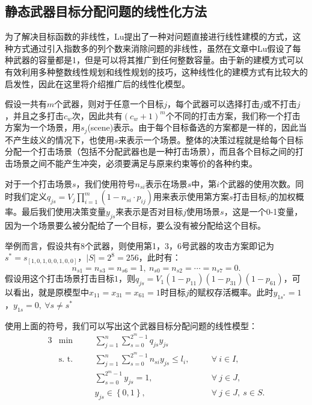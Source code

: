 \subsection{静态武器目标分配问题的线性化方法}
为了解决目标函数的非线性，Lu提出了一种对问题直接进行线性建模的方式，这种方式通过引入指数多的列个数来消除问题的非线性，虽然在文章中Lu假设了每种武器的容量都是1，但是可以将其推广到任何整数容量。由于新的建模方式可以有效利用多种整数线性规划和线性规划的技巧，这种线性化的建模方式有比较大的启发性，因此在这里将介绍推广后的线性化模型。

假设一共有$m$个武器，则对于任意一个目标$j$，每个武器可以选择打击$j$或不打击$j$，并且之多打击$c_w$次，因此共有$(c_w + 1)^m$个不同的打击方案，我们称一个打击方案为一个场景，用$s_j$(scene)表示。由于每个目标备选的方案都是一样的，因此当不产生歧义的情况下，也使用$s$来表示一个场景。整体的决策过程就是给每个目标分配一个打击场景（包括不分配武器也是一种打击场景），而且各个目标之间的打击场景之间不能产生冲突，必须要满足与原来约束等价的各种约束。

对于一个打击场景$s$，我们使用符号$n_{si}$表示在场景$s$中，第$i$个武器的使用次数。同时我们定义$q_{js} = V_j \prod_{i = 1}^m (1 - n_{si}\cdot p_{ij})$用来表示使用第方案$s$打击目标$j$的加权概率。最后我们使用决策变量$y_{js}$来表示是否对目标$j$使用场景$s$，这是一个0-1变量，因为一个场景要么被分配给了一个目标，要么没有被分配给这个目标。


举例而言，假设共有8个武器，则使用第1，3，6号武器的攻击方案即记为$s^* = s_{[1,0,1,0,0,1,0,0]}$，$|S| = 2^8 = 256$，此时有：
\begin{equation*} 
    n_{s1} = n_{s3} = n_{s6} = 1,\ n_{s0} = n_{s2} = \cdots = n_{s7} = 0.
\end{equation*}
假设用这个打击场景打击目标$1$，则$q_{js} = V_1(1 - p_{11})(1 - p_{31})(1 - p_{61})$，可以看出，就是原模型中$x_{11} = x_{31} = x_{61} = 1$时目标$j$的赋权存活概率。此时$y_{1s^*} = 1$，$y_{1s} = 0,\ \forall s \neq s^*$

使用上面的符号，我们可以写出这个武器目标分配问题的线性模型：
\begin{alignat}{3}
	&\min\quad && \sum_{j=1}^n \sum_{s=0}^{2^m -1} q_{js}y_{js} \tag{L1.1} \\ 
	&\text{s. t.}\quad &&\sum_{j=1}^n \sum_{s=0}^{2^m -1} n_{si}y_{js} \leq l_i, \quad && \forall ~ i \in I, \tag{L1.2}\\
	& && \sum_{s=0}^{2^m -1} y_{js} = 1, \quad && \forall ~ j \in J, \tag{L1.3}\\
	& && y_{js} \in \left\{ 0,1 \right\}, \quad && \forall ~ j \in J, ~ s \in S. \tag{L1.4}
\end{alignat}

